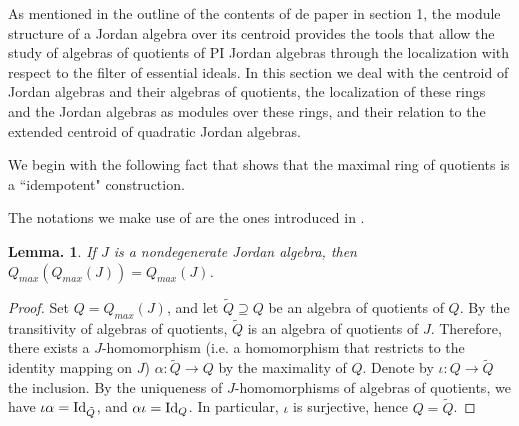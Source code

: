 \documentclass[a4paper,twoside,11pt]{article}
\theoremstyle{plain}
\theoremstyle{miestilo}
\newtheorem{lema}[subsection]{Lemma.}
\theoremstyle{misnotas}
\begin{document}
As mentioned in the outline of the contents of de paper in section 1, the module structure of a Jordan algebra over its centroid provides the tools that allow the study of algebras of quotients of PI Jordan algebras through the localization with respect to the filter of essential ideals. In this section we deal with the centroid of Jordan algebras and their algebras of quotients, the localization of these rings and the Jordan algebras as modules over these rings, and their relation to the extended centroid of quadratic Jordan algebras.

We begin with the following fact that shows that the maximal ring of quotients is a ``idempotent" construction.

The notations we make use of are the ones introduced in \cite{densos}.

\begin{lema}\label{maxclosure}
If $J$ is  a nondegenerate Jordan algebra, then $Q_{max}(Q_{max}(J))
= Q_{max}(J)$.\end{lema}

\begin{proof} Set $Q = Q_{max}(J)$, and let $\tilde Q\supseteq Q$ be an algebra of quotients of
$Q$. By the transitivity of algebras of quotients, $\tilde Q$ is an algebra of quotients of
$J$. Therefore, there exists a $J$-homomorphism (i.e. a
homomorphism that restricts to the identity mapping on $J$)
$\alpha: \tilde Q \rightarrow Q$ by the maximality of $Q$. Denote by $\iota: Q\rightarrow \tilde Q$ the
inclusion. By the uniqueness \cite[Lemma 2.11]{densos} of $J$-homomorphisms of algebras of quotients, we have $\iota\alpha = {\rm Id}_{\tilde
Q}$, and $\alpha\iota= {\rm Id}_Q$. In particular, $\iota$ is surjective, hence $Q= \tilde
Q$.\end{proof}
\end{document}
